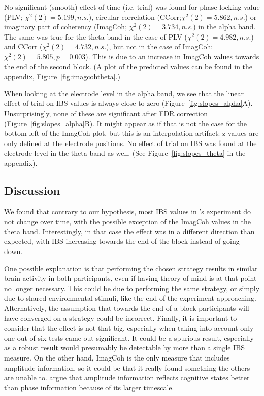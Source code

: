No significant (smooth) effect of time (i.e. trial) was found for phase locking
value (PLV; $\chi^2(2) = 5.199, n.s.$), circular correlation
(CCorr;$\chi^2(2) = 5.862, n.s.$) or imaginary part of coherency (ImagCoh;
$\chi^2(2) = 3.734, n.s.$) in the alpha band. The same was true for the theta
band in the case of PLV ($\chi^2(2) = 4.982, n.s.$) and CCorr
($\chi^2(2) = 4.732, n.s.$), but not in the case of ImagCoh:
$\chi^2(2) = 5.805, p = 0.003$). This is due to an increase in ImagCoh values
towards the end of the second block. (A plot of the predicted values can be
found in the appendix, Figure~\ref{fig:imagcohtheta}.)

When looking at the electrode level in the alpha band, we see that the linear
effect of trial on IBS values is always close to zero
(Figure~\ref{fig:slopes_alpha}A). Unsurprisingly, none of these are
significant after FDR correction
(Figure~\ref{fig:slopes_alpha}B). It might appear as if that is not the case for
the bottom left of the ImagCoh plot, but this is an interpolation artifact:
z-values are only defined at the electrode positions. No effect of trial on IBS
was found at the electrode level in the theta band as well. (See
Figure~\ref{fig:slopes_theta} in the appendix).

\subsection{Discussion}

We found that contrary to our hypothesis, most IBS values in
\textcite{newman_effects_2021}'s experiment do not change over time, with the
possible exception of the ImagCoh values in the theta band. Interestingly, in
that case the effect was in a different direction than expected, with IBS
increasing towards the end of the block instead of going down.

One possible explanation is that performing the chosen strategy results in
similar brain activity in both participants, even if having theory of mind is
at that point no longer necessary. This could be due to performing the same
strategy, or simply due to shared environmental stimuli, like the end of the
experiment approaching. Alternatively, the assumption that towards
the end of a block participants will have converged on a strategy could be
incorrect. Finally, it is important to consider that the effect is not that big,
especially when taking into account only one out of six tests came out
significant. It could be a spurious result, especially as a robust result would
presumably be detectable by more than a single IBS measure. On the other hand,
ImagCoh is the only measure that includes amplitude information, so it could be
that it really found something the others are unable to.
\textcite{ayrolles_hypyp_2021} argue that amplitude information reflects
cognitive states better than phase information because of its larger timescale.
